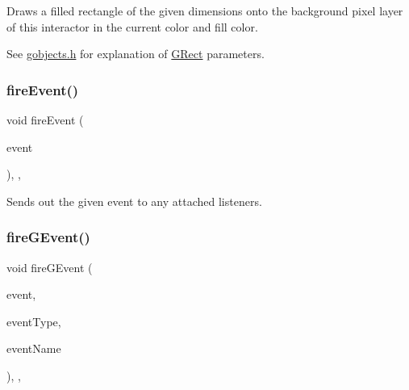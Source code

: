 Draws a filled rectangle of the given dimensions onto the background pixel layer of this interactor in the current color and fill color. 

See \mbox{\hyperlink{gobjects_8h_source}{gobjects.\+h}} for explanation of \mbox{\hyperlink{classsgl_1_1GRect}{G\+Rect}} parameters. \mbox{\label{classsgl_1_1GObservable_a63e5e5a6227c59c928493b11aceb0f67}} 
\subsubsection{\texorpdfstring{fire\+Event()}{fireEvent()}}
{\footnotesize\ttfamily void fire\+Event (\begin{DoxyParamCaption}\item[{\mbox{\hyperlink{classsgl_1_1GEvent}{G\+Event}} \&}]{event }\end{DoxyParamCaption})\hspace{0.3cm}{\ttfamily [protected]}, {\ttfamily [virtual]}, {\ttfamily [inherited]}}



Sends out the given event to any attached listeners. 

\mbox{\label{classsgl_1_1GObservable_ab3983ea07337b52020a29cc00c653d8d}} 
\subsubsection{\texorpdfstring{fire\+G\+Event()}{fireGEvent()}\hspace{0.1cm}{\footnotesize\ttfamily [1/8]}}
{\footnotesize\ttfamily void fire\+G\+Event (\begin{DoxyParamCaption}\item[{Q\+Event $\ast$}]{event,  }\item[{\mbox{\hyperlink{namespacesgl_a2628ea8d12e8b2563c32f05dc7fff6fa}{Event\+Type}}}]{event\+Type,  }\item[{const std\+::string \&}]{event\+Name }\end{DoxyParamCaption})\hspace{0.3cm}{\ttfamily [protected]}, {\ttfamily [virtual]}, {\ttfamily [inherited]}}



